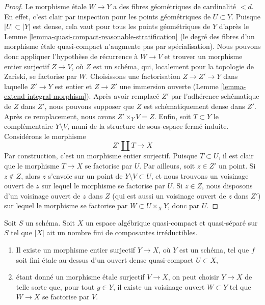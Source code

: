 \begin{proof}
\medskip\noindent
Le morphisme étale $W \to Y$ a des fibres géométriques de cardinalité $< d$.
En effet, c'est clair par inspection pour les points géométriques de
$U \subset Y$. Puisque $|U| \subset |Y|$ est dense, cela vaut pour tous les
points géométriques de $Y$ d'après le
Lemme \ref{lemma-quasi-compact-reasonable-stratification}
(le degré des fibres d'un morphisme étale quasi-compact n'augmente pas par
spécialisation). Nous pouvons donc appliquer l'hypothèse de récurrence à
$W \to V$ et trouver un morphisme entier surjectif $Z \to V$, où $Z$ est un
schéma, qui, localement pour la topologie de Zariski, se factorise par $W$.
Choisissons une factorisation $Z \to Z' \to Y$ dans laquelle $Z' \to Y$ est
entier et $Z \to Z'$ une immersion ouverte
(Lemme \ref{lemma-extend-integral-morphism}).
Après avoir remplacé $Z'$ par l'adhérence schématique de $Z$ dans $Z'$,
nous pouvons supposer que $Z$ est schématiquement dense dans $Z'$.
Après ce remplacement, nous avons $Z' \times_Y V = Z$. Enfin, soit
$T \subset Y$ le complémentaire $Y \setminus V$, muni de la structure de
sous-espace fermé induite. Considérons le morphisme
$$
Z' \amalg T \longrightarrow X
$$
Par construction, c'est un morphisme entier surjectif.
Puisque $T \subset U$, il est clair que le morphisme $T \to X$ se factorise
par $U$. Par ailleurs, soit $z \in Z'$ un point. Si $z \not \in Z$, alors $z$
s'envoie sur un point de $Y \setminus V \subset U$, et nous trouvons un
voisinage ouvert de $z$ sur lequel le morphisme se factorise par $U$.
Si $z \in Z$, nous disposons d'un voisinage ouvert de $z$ dans $Z$
(qui est aussi un voisinage ouvert de $z$ dans $Z'$) sur lequel le morphisme
se factorise par $W \subset U \times_X Y$, donc par $U$.
\end{proof}

\begin{lemma}
\label{lemma-there-is-a-scheme-integral-over-refined}
Soit $S$ un schéma. Soit $X$ un espace algébrique quasi-compact et
quasi-séparé sur $S$ tel que $|X|$ ait un nombre fini de composantes
irréductibles.
\begin{enumerate}
\item Il existe un morphisme entier surjectif $Y \to X$, où $Y$ est un
schéma, tel que $f$ soit fini étale au-dessus d'un ouvert dense quasi-compact
$U \subset X$,
\item étant donné un morphisme étale surjectif $V \to X$, on peut choisir
$Y \to X$ de telle sorte que, pour tout $y \in Y$, il existe un voisinage
ouvert $W \subset Y$ tel que $W \to X$ se factorise par $V$.
\end{enumerate}
\end{lemma}

